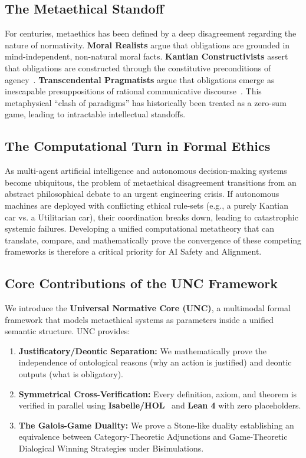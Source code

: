 \documentclass[runningheads]{llncs}
\begin{document}
\subsection{The Metaethical Standoff}
For centuries, metaethics has been defined by a deep disagreement regarding the nature of normativity. \textbf{Moral Realists} argue that obligations are grounded in mind-independent, non-natural moral facts. \textbf{Kantian Constructivists} assert that obligations are constructed through the constitutive preconditions of agency~\cite{gewirth1978reason}. \textbf{Transcendental Pragmatists} argue that obligations emerge as inescapable presuppositions of rational communicative discourse~\cite{apel1980transformation,habermas1990moral}. This metaphysical ``clash of paradigms'' has historically been treated as a zero-sum game, leading to intractable intellectual standoffs.

\subsection{The Computational Turn in Formal Ethics}
As multi-agent artificial intelligence and autonomous decision-making systems become ubiquitous, the problem of metaethical disagreement transitions from an abstract philosophical debate to an urgent engineering crisis. If autonomous machines are deployed with conflicting ethical rule-sets (e.g., a purely Kantian car vs. a Utilitarian car), their coordination breaks down, leading to catastrophic systemic failures. Developing a unified computational metatheory that can translate, compare, and mathematically prove the convergence of these competing frameworks is therefore a critical priority for AI Safety and Alignment.

\subsection{Core Contributions of the UNC Framework}
We introduce the \textbf{Universal Normative Core (UNC)}, a multimodal formal framework that models metaethical systems as parameters inside a unified semantic structure. UNC provides:
\begin{enumerate}
    \item \textbf{Justificatory/Deontic Separation:} We mathematically prove the independence of ontological reasons (why an action is justified) and deontic outputs (what is obligatory).
    \item \textbf{Symmetrical Cross-Verification:} Every definition, axiom, and theorem is verified in parallel using \textbf{Isabelle/HOL}~\cite{benzmuller2020logikey} and \textbf{Lean 4} with zero placeholders.
    \item \textbf{The Galois-Game Duality:} We prove a Stone-like duality establishing an equivalence between Category-Theoretic Adjunctions and Game-Theoretic Dialogical Winning Strategies under Bisimulations.
\end{enumerate}
\end{document}
